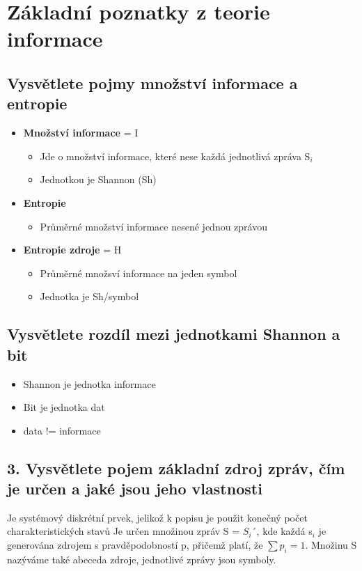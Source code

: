 \clearpage
\section{Základní poznatky z teorie informace}
\subsection{Vysvětlete pojmy množství informace a entropie}
\begin{itemize}
    \item \textbf{Množství informace} = I
    \begin{itemize}
        \item Jde o množství informace, které nese  každá jednotlivá zpráva S$_i$
        \item Jednotkou je Shannon (Sh)
    \end{itemize}
    \item \textbf{Entropie} 
    \begin{itemize}
        \item Průměrné množství informace nesené jednou zprávou
    \end{itemize}
    \item \textbf{Entropie zdroje} = H
    \begin{itemize}
        \item Průměrné množsví informace na jeden symbol
        \item Jednotka je Sh/symbol
    \end{itemize}
\end{itemize}

\subsection{ Vysvětlete rozdíl mezi jednotkami Shannon a bit}
\begin{itemize}
    \item Shannon je jednotka informace
    \item Bit je jednotka dat
    \item data != informace
\end{itemize}

\subsection{3.	Vysvětlete pojem základní zdroj zpráv, čím je určen a jaké jsou jeho vlastnosti}
Je systémový diskrétní prvek, jelikož k popisu je použit konečný počet charakteristických stavů
Je určen množinou zpráv S = ${S_i}$´, kde každá s$_i$ je generována zdrojem s pravděpodobností p, přičemž platí, že $\sum p_i = 1$.
Množinu S nazýváme také abeceda zdroje, jednotlivé zprávy jsou symboly.


